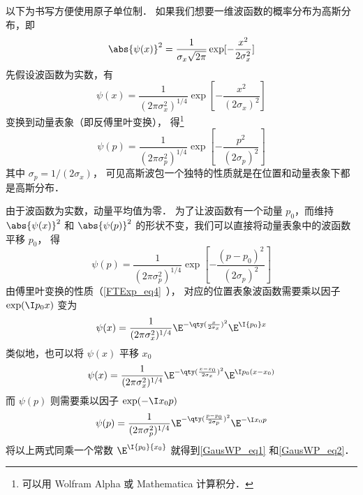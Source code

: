 以下为书写方便使用原子单位制． 如果我们想要一维波函数的概率分布为高斯分布，即
\begin{equation}
\abs{\psi (x)}^2 = \frac{1}{\sigma_x \sqrt{2\pi}} \exp[-\frac{x^2}{2\sigma_x^2}]
\end{equation}
先假设波函数为实数，有
\begin{equation}
\psi (x) = \frac{1}{(2\pi\sigma_x^2)^{1/4}} \exp[-\frac{x^2}{(2\sigma_x)^2}]
\end{equation}
变换到动量表象（即反傅里叶变换）， 得\footnote{可以用 Wolfram Alpha 或 Mathematica 计算积分．}
\begin{equation}
\psi(p) = \frac{1}{(2\pi\sigma_p^2)^{1/4}} \exp[-\frac{p^2}{(2\sigma_p)^2}]
\end{equation}
其中 $\sigma_p = 1/(2\sigma_x)$， 可见高斯波包一个独特的性质就是在位置和动量表象下都是高斯分布．

由于波函数为实数，动量平均值为零．%
为了让波函数有一个动量 $p_0$，而维持 $\abs{\psi(x)}^2$ 和 $\abs{\psi(p)}^2$ %
的形状不变，我们可以直接将动量表象中的波函数平移 $p_0$， 得
\begin{equation}
\psi (p) = \frac{1}{(2\pi\sigma_p^2)^{1/4}} \exp[-\frac{(p - p_0)^2}{(2\sigma_p)^2}]
\end{equation}
由傅里叶变换的性质（\autoref{FTExp_eq4}~）， 对应的位置表象波函数需要乘以因子 $\exp(\I p_0 x)$ 变为
\begin{equation}
\psi(x) = \frac{1}{(2\pi\sigma_x^2)^{1/4}} \E^{-\qty(\frac{x}{2\sigma_x})^2} {\E^{\I {p_0}x}}
\end{equation}
类似地，也可以将 $\psi(x)$ 平移 $x_0$ 
\begin{equation}
\psi (x) = \frac{1}{(2\pi\sigma_x^2)^{1/4}} \E^{-\qty(\frac{x-x_0}{2\sigma_x})^2} \E^{\I p_0 (x-x_0)}
\end{equation}
而 $\psi(p)$ 则需要乘以因子 $\exp (-\I x_0 p)$
\begin{equation}
\psi(p) = \frac{1}{(2\pi\sigma_p^2)^{1/4}} \E^{-\qty(\frac{p - p_0}{2\sigma_p})^2} \E^{-\I x_0 p}
\end{equation}
将以上两式同乘一个常数%
 ${\E^{\I{p_0}{x_0}}}$ 就得到\autoref{GausWP_eq1} 和\autoref{GausWP_eq2}．

